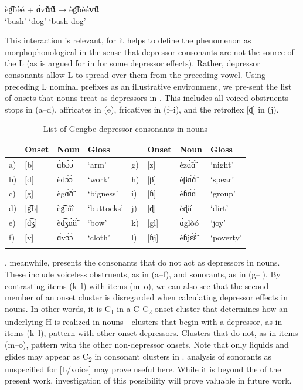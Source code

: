 \documentclass[output=paper,newtxmath,modfonts,nonflat,hidelinks]{langsci/langscibook}
\begin{document}
\ea\label{ex:lotven:2}
    \gll èg͡bèé + ɑ̀v\textbf{ũ̀ṹ} → èg͡bèé\textbf{vṹ}\\
    ‘bush’ {} ‘dog’ {} {‘bush dog’}\\
    \glt
    \z
          

This interaction is relevant, for it helps to define the phenomenon as morphophonological in the sense that depressor consonants are not the source of the L  (as is argued for in \citealt{Bradshaw1999} for some depressor effects). Rather, depressor consonants allow L  to spread over them from the preceding vowel. Using preceding L  nominal prefixes as an illustrative environment, we pre-sent the list of  onsets that nouns treat as depressors in . This includes all voiced obstruents—stops in (a–d), affricates in (e), fricatives in (f–i), and the retroflex [ɖ] in (j).

\begin{table}
\begin{tabularx}{\textwidth}{lllXlllX} 
\lsptoprule
&  Onset &  Noun &  Gloss &  &  Onset &  Noun &  Gloss\\
\midrule 
a) & [b]  & ɑ̀bɔ̀ɔ́  & ‘arm’      & {g)} & [z]  & èzɑ̃̀ɑ̃́  & ‘night’\\
b) & [d]  & èdɔ̀ɔ́  & ‘work’     & {h)} & [β]  & èβɑ̃̀ɑ̃́  & ‘spear’\\
c) & [g]  & ègɑ̃̀ɑ̃́  & ‘bigness’  & {i)} & [ɦ]  & èɦɑ̀ɑ́  & ‘group’\\
d) & [g͡b] & èg͡bĩ̀ĩ́ & ‘buttocks’ & {j)} & [ɖ]  & èɖìí          & ‘dirt’\\
e) & [d͡ʒ] & èd͡ʒɑ̃̀ɑ̃́ & ‘bow’      & {k)} & [gl] & ɑ̀glòó         & ‘joy’\\
f) & [v]  & ɑ̀vɔ̀ɔ́  & ‘cloth’    & {l)} & [ɦj] & èɦjɛ̃̀ɛ̃́ & ‘poverty’\\
\lspbottomrule
\end{tabularx}
\caption{List of Gengbe depressor consonants in nouns}
\label{tab:lotven:3}
\end{table}

, meanwhile, presents the consonants that do not act as depressors in  nouns. These include voiceless obstruents, as in (a–f), and sonorants, as in (g–l). By contrasting  items (k–l) with  items (m–o), we can also see that the second member of an onset cluster is disregarded when calculating depressor effects in nouns. In other words, it is C\textsubscript{1} in a C\textsubscript{1}C\textsubscript{2} onset cluster that determines how an underlying H is realized in  nouns—clusters that begin with a depressor, as in  items (k–l), pattern with other onset depressors. Clusters that do not, as in  items (m–o), pattern with the other non-depressor onsets. Note that only liquids and glides may appear as C\textsubscript{2} in consonant clusters in .  analysis of sonorants as unspecified for [L/voice] may prove useful here. While it is beyond the  of the present work, investigation of this possibility will prove valuable in future work.
\end{document}
